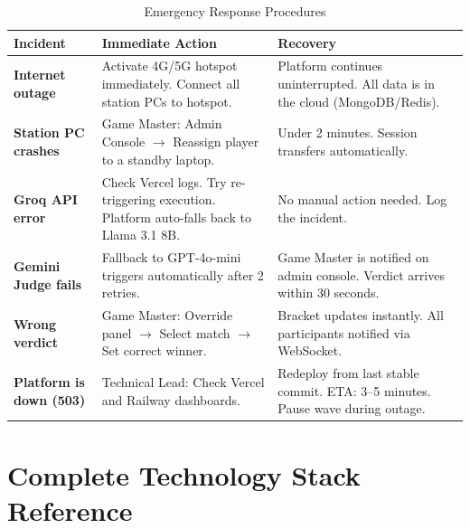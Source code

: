 \documentclass[11pt, a4paper]{article}
\begin{document}
\begin{table}[H]
\centering
\small\renewcommand{\arraystretch}{1.3}
\begin{tabularx}{\textwidth}{>{\bfseries}l X X}
\toprule
Incident & Immediate Action & Recovery \\
\midrule
Internet outage        & Activate 4G/5G hotspot immediately. Connect all station PCs to hotspot. & Platform continues uninterrupted. All data is in the cloud (MongoDB/Redis). \\
Station PC crashes     & Game Master: Admin Console $\to$ Reassign player to a standby laptop. & Under 2 minutes. Session transfers automatically. \\
Groq API error         & Check Vercel logs. Try re-triggering execution. Platform auto-falls back to Llama 3.1 8B. & No manual action needed. Log the incident. \\
Gemini Judge fails     & Fallback to GPT-4o-mini triggers automatically after 2 retries. & Game Master is notified on admin console. Verdict arrives within 30 seconds. \\
Wrong verdict          & Game Master: Override panel $\to$ Select match $\to$ Set correct winner. & Bracket updates instantly. All participants notified via WebSocket. \\
Platform is down (503) & Technical Lead: Check Vercel and Railway dashboards. & Redeploy from last stable commit. ETA: 3--5 minutes. Pause wave during outage. \\
\bottomrule
\end{tabularx}
\caption{Emergency Response Procedures}
\end{table}

\section{Complete Technology Stack Reference}
\end{document}
